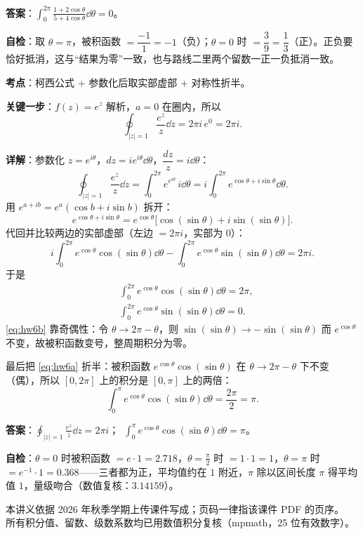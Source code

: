 \documentclass[11pt]{ctexart}
\let\origsubhdr\subhdr
\renewcommand{\subhdr}[1]{\par\needspace{4\baselineskip}\origsubhdr{#1}}
\renewcommand{\qbreak}{\needspace{0.45\textheight}}
\begin{document}
\textbf{答案}：$\displaystyle\int_0^{2\pi}\frac{1+2\cos\theta}{5+4\cos\theta}\dd\theta=0$。

\textbf{自检}：取 $\theta=\pi$，被积函数 $=\dfrac{-1}{1}=-1$（负）；$\theta=0$ 时 $=\dfrac{3}{9}=\dfrac13$（正）。正负要恰好抵消，这与“结果为零”一致，也与路线二里两个留数一正一负抵消一致。

\qbreak
{}
\label{app:hw6}

\textbf{考点}：柯西公式 + 参数化后取实部虚部 + 对称性折半。

\textbf{关键一步}：$f(z)=e^{z}$ 解析，$a=0$ 在圈内，所以
\[ \oint_{|z|=1}\frac{e^{z}}{z}\dd z=2\pi i\,e^{0}=2\pi i . \]

\textbf{详解}：参数化 $z=e^{i\theta}$，$dz=ie^{i\theta}\dd\theta$，$\dfrac{dz}{z}=i\dd\theta$：
\[ \oint_{|z|=1}\frac{e^{z}}{z}\dd z=\int_0^{2\pi}e^{e^{i\theta}}\,i\dd\theta
=i\int_0^{2\pi}e^{\cos\theta+i\sin\theta}\dd\theta . \]
用 $e^{a+ib}=e^{a}(\cos b+i\sin b)$ 拆开：
\[ e^{\cos\theta+i\sin\theta}=e^{\cos\theta}\bigl[\cos(\sin\theta)+i\sin(\sin\theta)\bigr] . \]
代回并比较两边的实部虚部（左边 $=2\pi i$，实部为 $0$）：
\[ i\int_0^{2\pi}e^{\cos\theta}\cos(\sin\theta)\dd\theta
-\int_0^{2\pi}e^{\cos\theta}\sin(\sin\theta)\dd\theta=2\pi i . \]
于是
\begin{align}
&\int_0^{2\pi}e^{\cos\theta}\cos(\sin\theta)\dd\theta=2\pi,\label{eq:hw6a}\\
&\int_0^{2\pi}e^{\cos\theta}\sin(\sin\theta)\dd\theta=0 .\label{eq:hw6b}
\end{align}
\eqref{eq:hw6b} 靠奇偶性：令 $\theta\to2\pi-\theta$，则 $\sin(\sin\theta)\to-\sin(\sin\theta)$ 而 $e^{\cos\theta}$ 不变，故被积函数变号，整周期积分为零。

最后把 \eqref{eq:hw6a} 折半：被积函数 $e^{\cos\theta}\cos(\sin\theta)$ 在 $\theta\to2\pi-\theta$ 下不变（偶），所以 $[0,2\pi]$ 上的积分是 $[0,\pi]$ 上的两倍：
\[ \int_0^{\pi}e^{\cos\theta}\cos(\sin\theta)\dd\theta=\frac{2\pi}{2}=\pi . \]

\textbf{答案}：$\displaystyle\oint_{|z|=1}\frac{e^{z}}{z}\dd z=2\pi i$；\ $\displaystyle\int_0^{\pi}e^{\cos\theta}\cos(\sin\theta)\dd\theta=\pi$。

\textbf{自检}：$\theta=0$ 时被积函数 $=e\cdot1=2.718$，$\theta=\tfrac{\pi}{2}$ 时 $=1\cdot1=1$，$\theta=\pi$ 时 $=e^{-1}\cdot1=0.368$——三者都为正，平均值约在 $1$ 附近，$\pi$ 除以区间长度 $\pi$ 得平均值 $1$，量级吻合（数值复核：$3.14159$）。

\vspace{6pt}
\begin{center}
{\color{petal}\small{}\quad{}\quad{}}
\end{center}
\begin{center}
{\small\color{inkgray}本讲义依据 2026 年秋季学期上传课件写成；页码一律指该课件 PDF 的页序。\\所有积分值、留数、级数系数均已用数值积分复核（mpmath，25 位有效数字）。}
\end{center}
\end{document}
